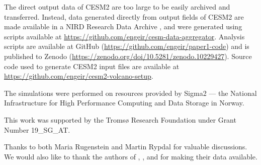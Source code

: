 \documentclass[draft]{agujournal2019}
\begin{document}
The direct output data of CESM2 are too large to be easily archived and transferred.
Instead, data generated directly from output fields of CESM2 are made available in a
NIRD Research Data Archive \cite{enger2024}, and were generated using scripts available
at \url{https://github.com/engeir/cesm-data-aggregator}. Analysis scripts are available
at GitHub (\url{https://github.com/engeir/paper1-code}) and is published to Zenodo
(\url{https://zenodo.org/doi/10.5281/zenodo.10229427}). Source code used to generate
CESM2 input files are available at \url{https://github.com/engeir/cesm2-volcano-setup}.







\acknowledgments


The simulations were performed on resources provided by Sigma2 --- the National
Infrastructure for High Performance Computing and Data Storage in Norway.

This work was supported by the Tromsø Research Foundation under Grant Number 19\_SG\_AT.

Thanks to both Maria Rugenstein and Martin Rypdal for valuable discussions. We would
also like to thank the authors of , , and
 for making their data available.

%
%



%
%
%
%
%
\end{document}
